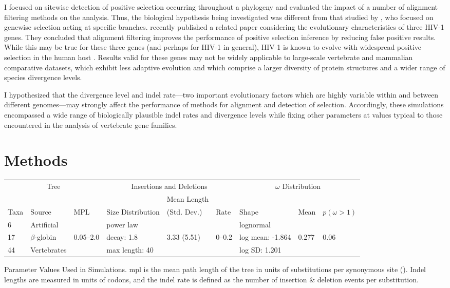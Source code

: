 I focused on sitewise detection of positive selection occurring
throughout a phylogeny and evaluated the impact of a number of
alignment filtering methods on the \sw analysis. Thus, the biological
hypothesis being investigated was different from that studied by
\citet{Fletcher2010}, who focused on genewise selection acting at
specific branches.  \citet{Privman2011Improving} recently published a
related paper considering the evolutionary characteristics of three
HIV-1 genes. They concluded that alignment filtering improves the
performance of positive selection inference by reducing false positive
results. While this may be true for these three genes (and perhaps for
HIV-1 in general), HIV-1 is known to evolve with widespread positive
selection in the human host \citep{Yang2003Widespread}. Results valid
for these genes may not be widely applicable to large-scale vertebrate
and mammalian comparative datasets, which exhibit less adaptive
evolution \citep{Kosiol2008} and which comprise a larger diversity of
protein structures and a wider range of species divergence levels.

I hypothesized that the divergence level and indel rate---two important
evolutionary factors which are highly variable within and between
different genomes---may strongly affect the performance of methods for
alignment and detection of selection. Accordingly, these simulations
encompassed a wide range of biologically plausible indel rates and
divergence levels while fixing other parameters at values typical to
those encountered in the \sw analysis of vertebrate gene families.

\section{Methods}


\bbtable
\centering
\begin{tabular}{lllllllll}
\toprule
 \multicolumn{3}{c}{Tree} & \multicolumn{3}{c}{Insertions and Deletions} & \multicolumn{3}{c}{$\omega$ Distribution} \\
\cmidrule(r){1-3} \cmidrule(r){4-6} \cmidrule(r){7-9}
 & & &  & Mean Length & & & & \\
Taxa & Source & MPL & Size Distribution & (Std. Dev.) & Rate & Shape & Mean & $p (\omega>1)$ \\
\midrule
6 & Artificial & & power law & & & lognormal & & \\
17 & $\beta$-globin & 0.05--2.0 & decay: 1.8 & 3.33 (5.51) & 0--0.2 & log mean: -1.864 & 0.277 & 0.06 \\
44 & Vertebrates & & max length: 40 & & &  log SD: 1.201 & & \\
\bottomrule
\end{tabular}
\caption{Parameter Values Used in Simulations. \ac{mpl} is the mean
  path length of the tree in units of substitutions per synonymous
  site (\ds). Indel lengths are measured in units of codons, and the
  indel rate is defined as the number of insertion \& deletion events
  per substitution.}
\label{table_indels_1}
\eetable

